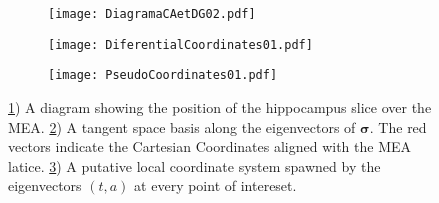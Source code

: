 \documentclass{article}
\newcommand{\cond}{\boldsymbol{\sigma}}
\begin{document}
\begin{figure}[h]
\centering
\begin{subfigure}[t]{0.20\textwidth}
\texttt{[image: DiagramaCAetDG02.pdf]}
\caption{}
\label{diagCA}
\end{subfigure}
\quad
\begin{subfigure}[t]{0.33\textwidth}
\texttt{[image: DiferentialCoordinates01.pdf]}
\caption{}
\label{loceig}
\end{subfigure}
\begin{subfigure}[t]{0.20\textwidth}
\texttt{[image: PseudoCoordinates01.pdf]}
\caption{}
\label{pseudocor}
\end{subfigure}
\caption{\ref{diagCA}) A diagram showing the position of
the hippocampus slice over the MEA. \ref{loceig}) 
A tangent space basis along the
eigenvectors of $\cond$. The red vectors indicate the
Cartesian Coordinates aligned with the MEA latice. 
\ref{pseudocor}) A putative local coordinate system spawned by the 
eigenvectors $(t,a)$ at every point of intereset. 
 }\label{diagdif}
\label{esquemas01}
\end{figure}
\end{document}
